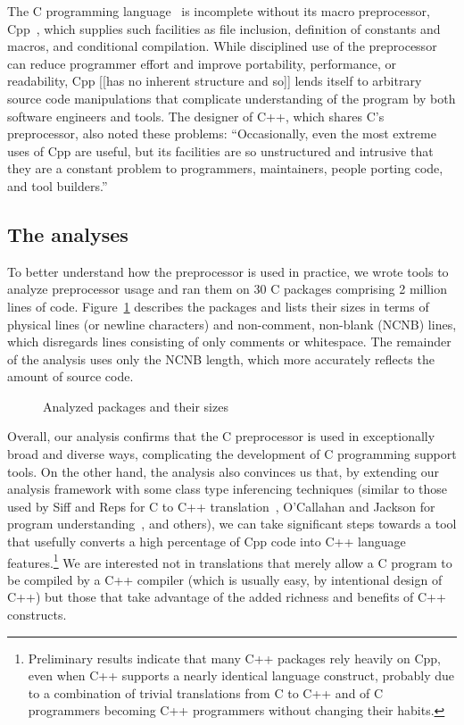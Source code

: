 \documentclass[11pt]{article}
\def\numpackages{30}
\def\numlines{2 million}
\begin{document}
The C programming language~\cite{ansi} is incomplete without its macro
preprocessor, Cpp~\cite[Ch.~3]{Harbison91}, which supplies such facilities
as file inclusion, definition of constants and macros, and conditional
compilation.  While disciplined use of the preprocessor can reduce
programmer effort and improve portability, performance, or readability, Cpp
[[has no inherent structure and so]] lends itself to arbitrary source code
manipulations that complicate understanding of the program by both software
engineers and tools.  The designer of C++, which shares C's preprocessor,
also noted these problems: ``Occasionally, even the most extreme uses of
Cpp are useful, but its facilities are so unstructured and intrusive that
they are a constant problem to programmers, maintainers, people porting
code, and tool builders.''~\cite[p.~424]{Stroustrup-DesignEvolution}


\subsection{The analyses}

To better understand how the preprocessor is used in practice,
we wrote tools to analyze preprocessor usage and ran them on {\numpackages}
C packages comprising {\numlines} lines of code.  Figure~\ref{fig:packages}
describes the packages and lists their sizes in terms of physical lines (or
newline characters) and non-comment, non-blank (NCNB) lines, which
disregards lines consisting of only comments or whitespace.  The remainder
of the analysis uses only the NCNB length, which more accurately reflects
the amount of source code.

\begin{figure}
\centering
{%
  \setlength{\tabcolsep}{.25em}
  
}
\caption{Analyzed packages and their sizes}
\label{fig:packages}
\end{figure}


Overall, our analysis confirms that the C preprocessor is used in
exceptionally broad and diverse ways, complicating the development of C
programming support tools.  On the other hand, the analysis also convinces
us that, by extending our analysis framework with some class type
inferencing techniques (similar to those used by Siff and Reps for C to C++
translation~\cite{Siff-fse96}, O'Callahan and Jackson for program
understanding~\cite{OCallahan-icse97}, and others), we can take significant
steps towards a tool that usefully converts a high percentage of Cpp code
into C++ language features.\footnote{Preliminary results indicate that many
  C++ packages rely heavily on Cpp, even when C++ supports a nearly
  identical language construct, probably due to a combination of trivial
  translations from C to C++ and of C programmers becoming C++ programmers
  without changing their habits.} We are interested not in translations
that merely allow a C program to be compiled by a C++ compiler (which is
usually easy, by intentional design of C++) but those that take advantage
of the added richness and benefits of C++ constructs.
\end{document}
